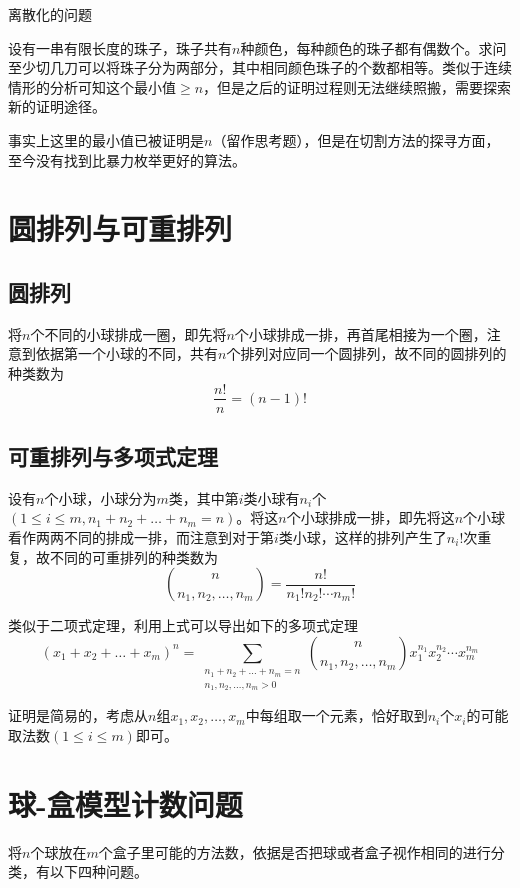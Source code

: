 ﻿\documentclass[11pt]{article}
\begin{document}
    \heiti 离散化的问题

    \songti 设有一串有限长度的珠子，珠子共有$n$种颜色，每种颜色的珠子都有偶数个。求问至少切几刀可以将珠子分为两部分，其中相同颜色珠子的个数都相等。类似于连续情形的分析可知这个最小值$\ge n$，但是之后的证明过程则无法继续照搬，需要探索新的证明途径。

    事实上这里的最小值已被证明是$n$（留作思考题），但是在切割方法的探寻方面，至今没有找到比暴力枚举更好的算法。

    \section{圆排列与可重排列}

    \subsection{圆排列}

    将$n$个不同的小球排成一圈，即先将$n$个小球排成一排，再首尾相接为一个圈，注意到依据第一个小球的不同，共有$n$个排列对应同一个圆排列，故不同的圆排列的种类数为
    \[
        \frac{n!}{n}=(n-1)!
    \]

    \subsection{可重排列与多项式定理}

    设有$n$个小球，小球分为$m$类，其中第$i$类小球有$n_i$个$(1\le i\le m, n_1+n_2+\dots +n_m=n)$。将这$n$个小球排成一排，即先将这$n$个小球看作两两不同的排成一排，而注意到对于第$i$类小球，这样的排列产生了$n_i!$次重复，故不同的可重排列的种类数为
    \[
        {n\choose {n_1, n_2,\dots ,n_m}}=\frac{n!}{n_1!n_2!\cdots n_m!}
    \]

    类似于二项式定理，利用上式可以导出如下的多项式定理
    \[
        (x_1+x_2+\dots +x_m)^n=\sum_{\substack{n_1+n_2+\dots +n_m=n \\ n_1, n_2,\dots ,n_m>0}}{n \choose {n_1, n_2,\dots ,n_m}}x_1^{n_1}x_2^{n_2}\cdots x_m^{n_m}
    \]

    证明是简易的，考虑从$n$组$x_1, x_2,\dots ,x_m$中每组取一个元素，恰好取到$n_i$个$x_i$的可能取法数$(1\le i\le m)$即可。

    \section{球-盒模型计数问题}

    将$n$个球放在$m$个盒子里可能的方法数，依据是否把球或者盒子视作相同的进行分类，有以下四种问题。
\end{document}
